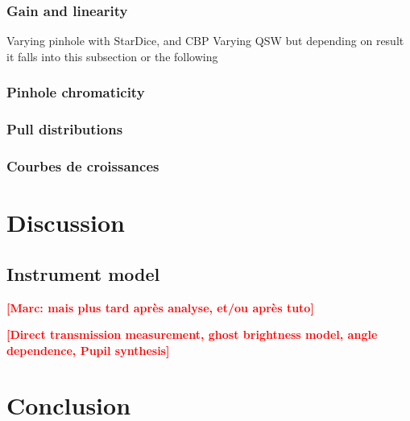\documentclass[onecolumn]{aa}
\newcommand{\todo}[1]{\textbf{\textcolor{red}{[#1]}}\xspace}
\begin{document}
\subsubsection{Gain and linearity}
\label{sec:gain}

Varying pinhole with StarDice, and CBP
Varying QSW but depending on result it falls into this subsection or the following

\subsubsection{Pinhole chromaticity}

\subsubsection{Pull distributions}

\subsubsection{Courbes de croissances}


\section{Discussion}

\subsection{Instrument model}\label{sec:model}

\todo{Marc: mais plus tard après analyse, et/ou après tuto}

\todo{Direct transmission measurement, ghost brightness model, angle dependence,  Pupil synthesis}

\section{Conclusion}
\label{sec:conclusion}
\end{document}
